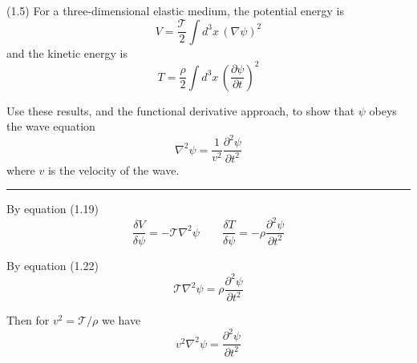 \documentclass[12pt]{article}
\begin{document}
(1.5)
For a three-dimensional elastic medium, the potential energy is
\begin{equation*}
V=\frac{\mathcal T}{2}\int d^3x\,(\nabla\psi)^2
\tag{1.46}
\end{equation*}
and the kinetic energy is
\begin{equation*}
T=\frac{\rho}{2}\int d^3x\,\left(\frac{\partial\psi}{\partial t}\right)^2
\tag{1.47}
\end{equation*}

Use these results, and the functional derivative approach,
to show that $\psi$ obeys the wave equation
\begin{equation*}
\nabla^2\psi=\frac{1}{v^2}\frac{\partial^2\psi}{\partial t^2}
\end{equation*}
where $v$ is the velocity of the wave.

\bigskip
\hrule

\bigskip
By equation (1.19)
\begin{equation*}
\frac{\delta V}{\delta\psi}=-\mathcal T\nabla^2\psi
\qquad
\frac{\delta T}{\delta\psi}=-\rho\frac{\partial^2\psi}{\partial t^2}
\end{equation*}

By equation (1.22)
\begin{equation*}
\mathcal T\nabla^2\psi=\rho\frac{\partial^2\psi}{\partial t^2}
\end{equation*}

Then for $v^2=\mathcal T/\rho$ we have
\begin{equation*}
v^2\nabla^2\psi=\frac{\partial^2\psi}{\partial t^2}
\end{equation*}
\end{document}
